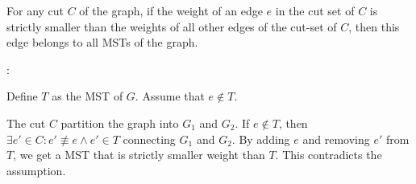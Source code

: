     \par For any cut $C$ of the graph, if the weight of an edge $e$ in the cut set of $C$
      is strictly smaller than the weights of all other edges of the cut-set of $C$, then
      this edge belongs to all MSTs of the graph.
    \par {}:
    \begin{smfont}
      \par Define $T$ as the MST of $G$. Assume that $e \not \in T$.
      \par The cut $C$ partition the graph into $G_{1}$ and $G_{2}$.
      If $e \not \in T$, then $\exists e' \in C: e' \not \equiv e \land e' \in T$ connecting $G_{1}$
      and $G_{2}$. By adding $e$ and removing $e'$ from $T$, we get a MST that
      is strictly smaller weight than $T$. This contradicts the assumption.
    \end{smfont}
